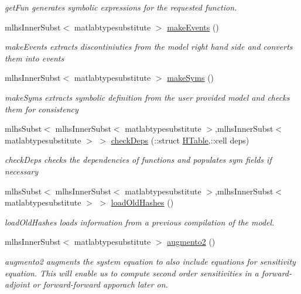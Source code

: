 \begin{DoxyCompactItemize}
\begin{DoxyCompactList}\small\item\em get\+Fun generates symbolic expressions for the requested function. \end{DoxyCompactList}\item 
mlhs\+Inner\+Subst$<$ matlabtypesubstitute $>$ \hyperlink{classamimodel_a2728abfdded1f9cd0d956118c7d32005}{make\+Events} ()
\begin{DoxyCompactList}\small\item\em make\+Events extracts discontiniuties from the model right hand side and converts them into events \end{DoxyCompactList}\item 
mlhs\+Inner\+Subst$<$ matlabtypesubstitute $>$ \hyperlink{classamimodel_a9f914e11f88fbdea879c0d8f4c26cd0a}{make\+Syms} ()
\begin{DoxyCompactList}\small\item\em make\+Syms extracts symbolic definition from the user provided model and checks them for consistency \end{DoxyCompactList}\item 
mlhs\+Subst$<$ mlhs\+Inner\+Subst$<$ matlabtypesubstitute $>$,mlhs\+Inner\+Subst$<$ matlabtypesubstitute $>$ $>$ \hyperlink{classamimodel_aa04dcfc1d2188cae948a75ebd46a6e03}{check\+Deps} (\+::struct \hyperlink{classamimodel_aafe6335df413dd688a2f44efba012cf1}{H\+Table},\+::cell deps)
\begin{DoxyCompactList}\small\item\em check\+Deps checks the dependencies of functions and populates sym fields if necessary \end{DoxyCompactList}\item 
mlhs\+Subst$<$ mlhs\+Inner\+Subst$<$ matlabtypesubstitute $>$,mlhs\+Inner\+Subst$<$ matlabtypesubstitute $>$ $>$ \hyperlink{classamimodel_ab21f46296b0ee0a141c38143a79ad396}{load\+Old\+Hashes} ()
\begin{DoxyCompactList}\small\item\em load\+Old\+Hashes loads information from a previous compilation of the model. \end{DoxyCompactList}\item 
mlhs\+Inner\+Subst$<$ matlabtypesubstitute $>$ \hyperlink{classamimodel_a2c41ab7adc2f815030ba175132e648c5}{augmento2} ()
\begin{DoxyCompactList}\small\item\em augmento2 augments the system equation to also include equations for sensitivity equation. This will enable us to compute second order sensitivities in a forward-\/adjoint or forward-\/forward apporach later on. \end{DoxyCompactList}\end{DoxyCompactItemize}
